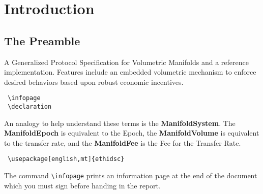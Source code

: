 \chapter{Introduction}\label{sec:introduction}


\section{The Preamble}\label{sec:preamble}
A Generalized Protocol Specification for Volumetric Manifolds and a reference implementation. Features include an embedded  volumetric mechanism to enforce desired behaviors based upon robust economic incentives.
\begin{verbatim}
 \infopage
 \declaration
\end{verbatim}

An analogy to help understand these terms is the \textbf{ManifoldSystem}. The \textbf{ManifoldEpoch} is equivalent to the Epoch, the \textbf{ManifoldVolume} is equivalent to the transfer rate, and the \textbf{ManifoldFee} is the Fee for the Transfer Rate. 


\begin{verbatim}
 \usepackage[english,mt]{ethidsc}
\end{verbatim}
The command \texttt{\textbackslash infopage} prints an information page at the end of the document which you must sign before handing in the report.
